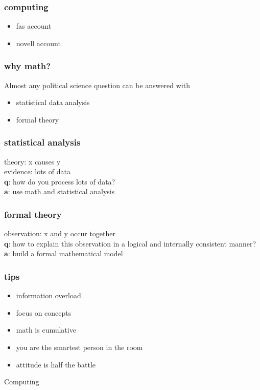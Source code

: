 \documentclass[]{beamer}
\newcommand{\red}{\color{red}}
\newcommand{\black}{\color{black}}
\begin{document}
\begin{frame}
\frametitle{computing}
\pause
\begin{itemize}
\item fas account
\pause
\item novell account
\end{itemize}
\end{frame}

\begin{frame}
\frametitle{why math?}
\pause
Almost any political science question can be answered with
\pause
\bigskip
\begin{itemize}
\item statistical data analysis
\pause
\item formal theory
\end{itemize}
\end{frame}

\begin{frame}
\frametitle{statistical analysis}
\pause
theory: x causes y \\
\pause
\bigskip
evidence: lots of data\\
\pause
\bigskip
\textbf{q}: how do you process lots of data? \\
\pause
\bigskip
\textbf{a}: use math and statistical analysis
\end{frame}

\begin{frame}
\frametitle{formal theory}
\pause
observation: x and y occur together \\
\pause
\bigskip
\textbf{q}: how to explain this observation in a logical and internally consistent manner? \\
\pause
\bigskip
\textbf{a}: build a formal mathematical model
\end{frame}

\begin{frame}
\frametitle{tips}
\pause
\begin{itemize}
\item information overload
\pause
\item focus on \red concepts \black 
\pause
\item math is cumulative
\pause
\item you are the smartest person in the room
\pause
\item attitude is half the battle
\end{itemize}
\end{frame}

\begin{frame}
\begin{center}
Computing
\end{center}
\end{frame}
\end{document}
